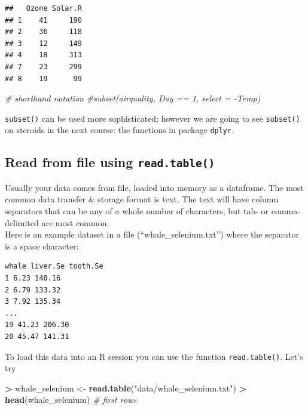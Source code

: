 \documentclass[]{book}
\newenvironment{Shaded}{\begin{snugshade}}{\end{snugshade}}
\newcommand{\CommentTok}[1]{\textcolor[rgb]{0.56,0.35,0.01}{\textit{#1}}}
\newcommand{\KeywordTok}[1]{\textcolor[rgb]{0.13,0.29,0.53}{\textbf{#1}}}
\newcommand{\NormalTok}[1]{#1}
\newcommand{\OperatorTok}[1]{\textcolor[rgb]{0.81,0.36,0.00}{\textbf{#1}}}
\newcommand{\StringTok}[1]{\textcolor[rgb]{0.31,0.60,0.02}{#1}}
\begin{document}
\begin{verbatim}
##   Ozone Solar.R
## 1    41     190
## 2    36     118
## 3    12     149
## 4    18     313
## 7    23     299
## 8    19      99
\end{verbatim}

\begin{Shaded}
\begin{Highlighting}[]
\CommentTok{# shorthand notation}
\CommentTok{#subset(airquality, Day == 1, select = -Temp)}
\end{Highlighting}
\end{Shaded}

\texttt{subset()} can be used more sophisticated; however we are going to see \texttt{subset()} on steroids in the next course: the functions in package \texttt{dplyr}.

\hypertarget{read-from-file-using-read.table}{%
\subsection{\texorpdfstring{Read from file using \texttt{read.table()}}{Read from file using read.table()}}\label{read-from-file-using-read.table}}

Usually your data comes from file, loaded into memory as a dataframe. The most common data transfer \& storage format is text. The text will have column separators that can be any of a whole number of characters, but tab- or comma-delimited are most common.\\
Here is an example dataset in a file (``whale\_selenium.txt'') where the separator is a space character:

\begin{verbatim}
whale liver.Se tooth.Se  
1 6.23 140.16  
2 6.79 133.32  
3 7.92 135.34  
...  
19 41.23 206.30  
20 45.47 141.31  
\end{verbatim}

To load this data into an R session you can use the function \texttt{read.table()}. Let's try

\begin{Shaded}
\begin{Highlighting}[]
\OperatorTok{>}\StringTok{ }\NormalTok{whale_selenium <-}\StringTok{ }\KeywordTok{read.table}\NormalTok{(}\StringTok{"data/whale_selenium.txt"}\NormalTok{)}
\OperatorTok{>}\StringTok{ }\KeywordTok{head}\NormalTok{(whale_selenium) }\CommentTok{# first rows}
\end{Highlighting}
\end{Shaded}
\end{document}
